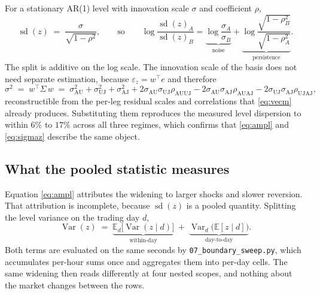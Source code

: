 \documentclass[11pt,a4paper]{article}
\newcommand{\AU}{\mathrm{AU}}
\newcommand{\UJ}{\mathrm{UJ}}
\newcommand{\AJ}{\mathrm{AJ}}
\newcommand{\code}[1]{\texttt{\small #1}}
\begin{document}
For a stationary AR(1) level with innovation scale $\sigma$ and coefficient $\rho$,
\begin{equation}
\operatorname{sd}(z) \;=\; \frac{\sigma}{\sqrt{1-\rho^{2}}},
\qquad\text{so}\qquad
\log \frac{\operatorname{sd}(z)_A}{\operatorname{sd}(z)_B}
= \underbrace{\log \frac{\sigma_A}{\sigma_B}}_{\text{noise}}
+ \underbrace{\log \frac{\sqrt{1-\rho_B^{2}}}{\sqrt{1-\rho_A^{2}}}}_{\text{persistence}} .
\label{eq:ampl}
\end{equation}
The split is additive on the log scale. The innovation scale of the basis does not need
separate estimation, because $\varepsilon_z = w^{\top}e$ and therefore
\begin{equation}
\sigma^2 \;=\; w^{\top} \Sigma\, w
\;=\; \sigma_{\AU}^2 + \sigma_{\UJ}^2 + \sigma_{\AJ}^2
+ 2\sigma_{\AU}\sigma_{\UJ}\rho_{\AU\UJ}
- 2\sigma_{\AU}\sigma_{\AJ}\rho_{\AU\AJ}
- 2\sigma_{\UJ}\sigma_{\AJ}\rho_{\UJ\AJ},
\label{eq:sigmaz}
\end{equation}
reconstructible from the per-leg residual scales and correlations that \eqref{eq:vecm}
already produces. Substituting them reproduces the measured level dispersion to within
$6\%$ to $17\%$ across all three regimes, which confirms that \eqref{eq:ampl} and
\eqref{eq:sigmaz} describe the same object.

\subsection{What the pooled statistic measures}

Equation \eqref{eq:ampl} attributes the widening to larger shocks and slower reversion. That
attribution is incomplete, because $\operatorname{sd}(z)$ is a pooled quantity. Splitting the
level variance on the trading day $d$,
\begin{equation}
\operatorname{Var}(z)
\;=\; \underbrace{\mathbb{E}_d\bigl[\operatorname{Var}(z \mid d)\bigr]}_{\text{within-day}}
\;+\; \underbrace{\operatorname{Var}_d\bigl(\mathbb{E}[z \mid d]\bigr)}_{\text{day-to-day}} .
\label{eq:totalvar}
\end{equation}
Both terms are evaluated on the same seconds by \code{07\_boundary\_sweep.py}, which
accumulates per-hour sums once and aggregates them into per-day cells. The same widening
then reads differently at four nested scopes, and nothing about the market changes between
the rows.
\end{document}
